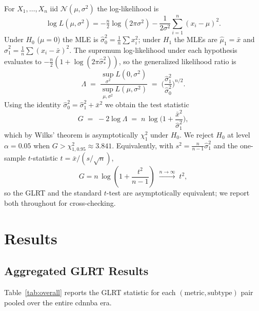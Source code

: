 \documentclass[twoside,11pt]{article}
\begin{document}
For $X_1,\dots,X_n$ iid $\mathcal{N}(\mu, \sigma^2)$ the log-likelihood is
\[
		\log L(\mu, \sigma^2) = -\tfrac{n}{2}\log(2\pi\sigma^2) -
		\frac{1}{2\sigma^2}\sum_{i=1}^n (x_i - \mu)^2.
\]
Under $H_0$ ($\mu=0$) the MLE is $\hat\sigma^2_0 = \tfrac{1}{n}\sum x_i^2$;
under $H_1$ the MLEs are $\hat\mu_1 = \bar x$ and $\hat\sigma^2_1 =
\tfrac{1}{n}\sum (x_i - \bar x)^2$. The supremum log-likelihood under each
hypothesis evaluates to $-\tfrac{n}{2}(1 + \log(2\pi\hat\sigma^2_*))$, so
the generalized likelihood ratio is
\begin{equation}
		\Lambda \;=\; \frac{\sup_{\sigma^2} L(0, \sigma^2)}
		{\sup_{\mu, \sigma^2} L(\mu, \sigma^2)}
		\;=\; \Big(\frac{\hat\sigma^2_1}{\hat\sigma^2_0}\Big)^{n/2}.
		\label{eq:lambda}
\end{equation}
Using the identity $\hat\sigma^2_0 = \hat\sigma^2_1 + \bar x^2$ we obtain
the test statistic
\begin{equation}
		G \;=\; -2\log\Lambda \;=\; n\,\log\!\Big(1 + \frac{\bar x^2}{\hat\sigma^2_1}\Big),
		\label{eq:glrt}
\end{equation}
which by Wilks' theorem is asymptotically $\chi^2_1$ under $H_0$. We reject
$H_0$ at level $\alpha = 0.05$ when $G > \chi^2_{1, 0.95} \approx 3.841$.
Equivalently, with $s^2 = \tfrac{n}{n-1}\hat\sigma^2_1$ and the one-sample
$t$-statistic $t = \bar x / (s/\sqrt n)$,
\[
		G = n\,\log\!\left(1 + \frac{t^2}{n - 1}\right) \;\xrightarrow{n\to\infty}\; t^2,
\]
so the GLRT and the standard $t$-test are asymptotically equivalent;
we report both throughout for cross-checking.

\section{Results}
\label{sec:results}

\subsection{Aggregated GLRT Results}

Table~\ref{tab:overall} reports the GLRT statistic for each
$(\text{metric}, \text{subtype})$ pair pooled over the entire cdnnba era.
\end{document}

